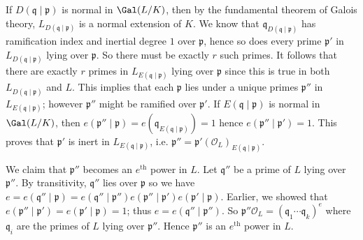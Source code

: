 \documentclass[11pt,letterpaper]{article}
\begin{document}
\begin{solution}
    If $D(\mathfrak{q}\mid \mathfrak{p})$ is normal in $\Gal(L /K)$, then by the fundamental theorem of Galois theory, $L_{D(\mathfrak{q}\mid \mathfrak{p})}$ is a normal extension of $K$. We know that $\mathfrak{q}_{D(\mathfrak{q}\mid \mathfrak{p})}$ has ramification index and inertial degree $1$ over $\mathfrak{p}$, hence so does every prime $\mathfrak{p}'$ in $L_{D(\mathfrak{q}\mid \mathfrak{p})}$ lying over $\mathfrak{p}$. So there must be exactly $r$ such primes. It follows that there are exactly $r$ primes in $L_{E(\mathfrak{q}\mid \mathfrak{p})}$ lying over $\mathfrak{p}$ since this is true in both $L_{D(\mathfrak{q}\mid \mathfrak{p})}$ and $L$. This implies that each $\mathfrak{p}$ lies under a unique primes $\mathfrak{p}''$ in $L_{E(\mathfrak{q}\mid \mathfrak{p})}$; however $\mathfrak{p}''$ might be ramified over $\mathfrak{p}'$. If $E(\mathfrak{q}\mid \mathfrak{p})$ is normal in $\Gal(L /K)$, then $e(\mathfrak{p}''\mid \mathfrak{p})=e(\mathfrak{q}_{E(\mathfrak{q}\mid \mathfrak{p})})=1$ hence $e(\mathfrak{p}''\mid \mathfrak{p}')=1$. This proves that $\mathfrak{p}'$ is inert in $L_{E(\mathfrak{q}\mid \mathfrak{p})}$, i.e. $\mathfrak{p}'' = \mathfrak{p}'(\mathcal{O}_L)_{E(\mathfrak{q}\mid \mathfrak{p})}$. 
    
    We claim that $\mathfrak{p}''$ becomes an $e^{\text{th}}$ power in $L$. Let $\mathfrak{q}''$ be a prime of $L$ lying over $\mathfrak{p}''$. By transitivity, $\mathfrak{q}''$ lies over $\mathfrak{p}$ so we have $e=e(\mathfrak{q}''\mid \mathfrak{p})=e(\mathfrak{q}''\mid \mathfrak{p}'')e(\mathfrak{p}''\mid \mathfrak{p}')e(\mathfrak{p}'\mid \mathfrak{p})$. Earlier, we showed that $e(\mathfrak{p}''\mid \mathfrak{p}')=e(\mathfrak{p}'\mid \mathfrak{p})=1$; thus $e=e(\mathfrak{q}''\mid \mathfrak{p}'')$. So $\mathfrak{p}''\mathcal{O}_L = (\mathfrak{q}_1\cdots \mathfrak{q}_k)^e$ where $\mathfrak{q}_i$ are the primes of $L$ lying over $\mathfrak{p}''$. Hence $\mathfrak{p}''$ is an $e^{\text{th}}$ power in $L$.     
\end{solution}
\end{document}
